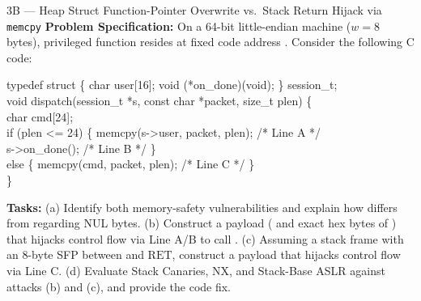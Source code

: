 \begin{templatebox}{3B --- Heap Struct Function-Pointer Overwrite vs.\ Stack Return Hijack via \texttt{memcpy}}
\textbf{Problem Specification:} On a 64-bit little-endian machine ($w = 8$ bytes), privileged function  resides at fixed code address . Consider the following C code:
\begin{codeblock}
typedef struct \{ char user[16]; void (*on\_done)(void); \} session\_t;\\
void dispatch(session\_t *s, const char *packet, size\_t plen) \{\\
\hspace*{1.5em} char cmd[24];\\
\hspace*{1.5em} if (plen <= 24) \{ memcpy(s->user, packet, plen); \hspace*{1em} /* Line A */\\
\hspace*{8.8em} s->on\_done(); \hspace*{8.2em} /* Line B */ \}\\
\hspace*{1.5em} else \hspace*{4.2em} \{ memcpy(cmd, packet, plen); \hspace*{2.8em} /* Line C */ \}\\
\}
\end{codeblock}
\textbf{Tasks:} (a) Identify both memory-safety vulnerabilities and explain how  differs from  regarding NUL bytes. (b) Construct a payload ( and exact hex bytes of ) that hijacks control flow via Line A/B to call . (c) Assuming a stack frame with an 8-byte SFP between  and $\mathrm{RET}$, construct a payload that hijacks control flow via Line C. (d) Evaluate Stack Canaries, NX, and Stack-Base ASLR against attacks (b) and (c), and provide the code fix.


\end{templatebox}
